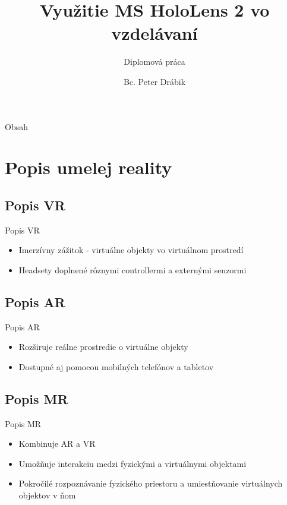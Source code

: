\documentclass[pdf]{beamer}
\title{Využitie MS HoloLens 2 vo vzdelávaní}
\subtitle{Diplomová práca}
\author{Bc. Peter Drábik}
\begin{document}
\date{}
\begin{frame}
    \titlepage 
\end{frame}

\begin{frame}{Obsah}
    \tableofcontents
\end{frame}


\section{Popis umelej reality}

\subsection{Popis VR}
\begin{frame}{Popis VR}
    \begin{itemize}
        \item Imerzívny zážitok - virtuálne objekty vo virtuálnom prostredí
        \item Headsety doplnené rôznymi controllermi a externými senzormi
    \end{itemize}
\end{frame}

\subsection{Popis AR}
\begin{frame}{Popis AR}
    \begin{itemize}
        \item Rozširuje reálne prostredie o virtuálne objekty
        \item Dostupné aj pomocou mobilných telefónov a tabletov
    \end{itemize}
\end{frame}

\subsection{Popis MR}
\begin{frame}{Popis MR}
    \begin{itemize}
        \item Kombinuje AR a VR
        \item Umožňuje interakciu medzi fyzickými a virtuálnymi objektami
        \item Pokročilé rozpoznávanie fyzického priestoru a umiestňovanie virtuálnych objektov v ňom
    \end{itemize}
\end{frame}
\end{document}
